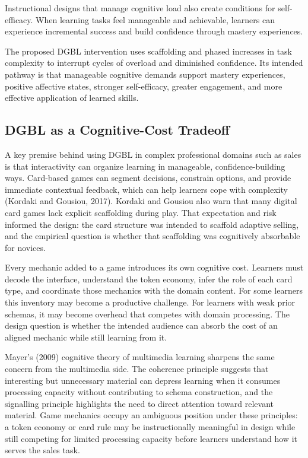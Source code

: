\documentclass[12pt]{report}
\begin{document}
Instructional designs that manage cognitive load also create conditions for self-efficacy. When learning tasks feel manageable and achievable, learners can experience incremental success and build confidence through mastery experiences.

The proposed DGBL intervention uses scaffolding and phased increases in task complexity to interrupt cycles of overload and diminished confidence. Its intended pathway is that manageable cognitive demands support mastery experiences, positive affective states, stronger self-efficacy, greater engagement, and more effective application of learned skills.

\subsection{DGBL as a Cognitive-Cost Tradeoff}
A key premise behind using DGBL in complex professional domains such as sales is that interactivity can organize learning in manageable, confidence-building ways. Card-based games can segment decisions, constrain options, and provide immediate contextual feedback, which can help learners cope with complexity (Kordaki and Gousiou, 2017). Kordaki and Gousiou also warn that many digital card games lack explicit scaffolding during play. That expectation and risk informed the design: the card structure was intended to scaffold adaptive selling, and the empirical question is whether that scaffolding was cognitively absorbable for novices.

Every mechanic added to a game introduces its own cognitive cost. Learners must decode the interface, understand the token economy, infer the role of each card type, and coordinate those mechanics with the domain content. For some learners this inventory may become a productive challenge. For learners with weak prior schemas, it may become overhead that competes with domain processing. The design question is whether the intended audience can absorb the cost of an aligned mechanic while still learning from it.

Mayer's (2009) cognitive theory of multimedia learning sharpens the same concern from the multimedia side. The coherence principle suggests that interesting but unnecessary material can depress learning when it consumes processing capacity without contributing to schema construction, and the signalling principle highlights the need to direct attention toward relevant material. Game mechanics occupy an ambiguous position under these principles: a token economy or card rule may be instructionally meaningful in design while still competing for limited processing capacity before learners understand how it serves the sales task.
\end{document}
